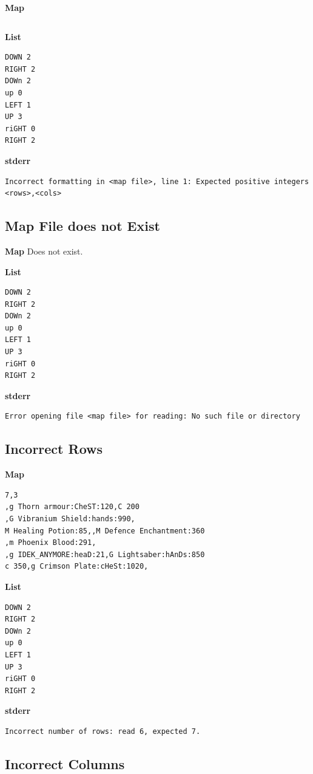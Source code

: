 \documentclass{article}
\begin{document}
\quad \textbf{Map}
\begin{lstlisting}

\end{lstlisting}

\textbf{List}
\begin{lstlisting}
DOWN 2
RIGHT 2
DOWn 2
up 0
LEFT 1
UP 3
riGHT 0
RIGHT 2
\end{lstlisting}
\pagebreak

\textbf{stderr}
\begin{lstlisting}
Incorrect formatting in <map file>, line 1: Expected positive integers <rows>,<cols>
\end{lstlisting}

\subsection{Map File does not Exist}

\quad \textbf{Map}
Does not exist.

\textbf{List}
\begin{lstlisting}
DOWN 2
RIGHT 2
DOWn 2
up 0
LEFT 1
UP 3
riGHT 0
RIGHT 2
\end{lstlisting}
\pagebreak

\textbf{stderr}
\begin{lstlisting}
Error opening file <map file> for reading: No such file or directory
\end{lstlisting}

\subsection{Incorrect Rows}

\quad \textbf{Map}
\begin{lstlisting}
7,3
,g Thorn armour:CheST:120,C 200
,G Vibranium Shield:hands:990,
M Healing Potion:85,,M Defence Enchantment:360
,m Phoenix Blood:291,
,g IDEK_ANYMORE:heaD:21,G Lightsaber:hAnDs:850
c 350,g Crimson Plate:cHeSt:1020,
\end{lstlisting}

\textbf{List}
\begin{lstlisting}
DOWN 2
RIGHT 2
DOWn 2
up 0
LEFT 1
UP 3
riGHT 0
RIGHT 2
\end{lstlisting}
\pagebreak

\textbf{stderr}
\begin{lstlisting}
Incorrect number of rows: read 6, expected 7.
\end{lstlisting}

\subsection{Incorrect Columns}
\end{document}
